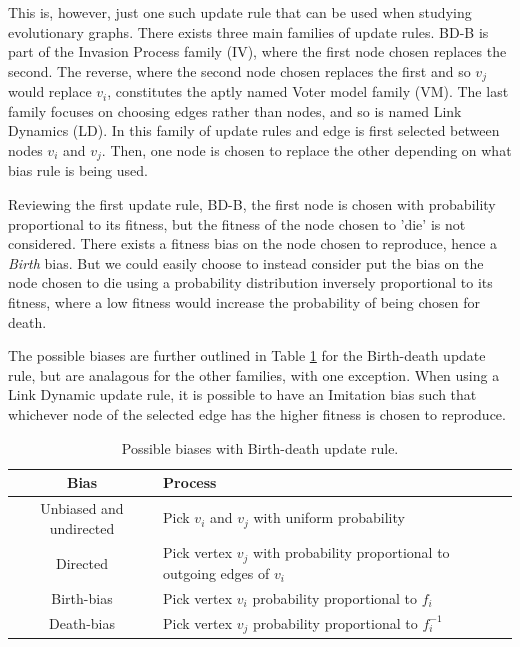\documentclass[12pt, AofM.tex]{subfiles}
\begin{document}
This is, however, just one such update rule that can be used when studying evolutionary graphs. There exists three main families of update rules. BD-B is part of the Invasion Process family (IV), where the first node chosen replaces the second. The reverse, where the second node chosen replaces the first and so $v_j$ would replace $v_i$, constitutes the aptly named Voter model family (VM). The last family focuses on choosing edges rather than nodes, and so is named Link Dynamics (LD). In this family of update rules and edge is first selected between nodes $v_i$ and $v_j$. Then, one node is chosen to replace the other depending on what bias rule is being used. 

Reviewing the first update rule, BD-B, the first node is chosen with probability proportional to its fitness, but the fitness of the node chosen to 'die' is not considered. There exists a fitness bias on the node chosen to reproduce, hence a \emph{Birth} bias. But we could easily choose to instead consider put the bias on the node chosen to die using a probability distribution inversely proportional to its fitness, where a low fitness would increase the probability of being chosen for death. 


The possible biases are further outlined in Table \ref{bias-table} for the Birth-death update rule, but are analagous for the other families, with one exception. When using a Link Dynamic update rule, it is possible to have an Imitation bias such that whichever node of the selected edge has the higher fitness is chosen to reproduce.    

\begin{table}
    \centering
    \caption{Possible biases with Birth-death update rule.}
    \label{bias-table}
    \begin{tabularx}{\textwidth}{c | X}
        \hline
        Bias & Process \\
        \hline \hline
        Unbiased and undirected & Pick $v_i$ and $v_j$ with uniform probability \\
        Directed & Pick vertex $v_j$ with probability proportional to outgoing edges of $v_i$ \\
        Birth-bias & Pick vertex $v_i$ probability proportional to $f_i$ \\
        Death-bias & Pick vertex $v_j$ probability proportional to $f^{-1}_i$ \\
    \end{tabularx}
\end{table}
\end{document}

